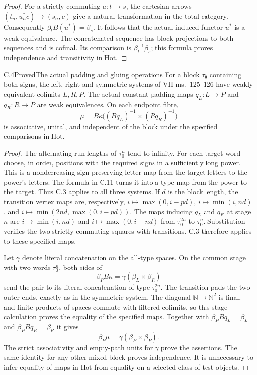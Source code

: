 \begin{proof}
For a strictly commuting $u:t\to s$, the cartesian arrows
$(t_n,u_n^*c)\to(s_n,c)$ give a natural transformation in the total
category. Consequently $\beta_t B(u^*)=\beta_s$. It follows that
the actual induced functor $u^*$ is a weak equivalence. The
concatenated sequence has block projections to both sequences and
is cofinal. Its comparison is $\beta_t^{-1}\beta_s$; this formula
proves independence and transitivity in $\mathrm{Hot}$.
\end{proof}

\begin{claim}{C.4}{Proved}{The actual padding and gluing operations}
For a block $\tau_0$ containing both signs, the left, right and
symmetric systems of VII ms.~125--126 have weakly equivalent
colimits $L,R,P$. The actual constant-padding maps $q_L:L\to P$
and $q_R:R\to P$ are weak equivalences. On each endpoint fibre,
\[
 \mu=B\kappa\bigl((Bq_L)^{-1}\times(Bq_R)^{-1}\bigr)
\]
is associative, unital, and independent of the block under the
specified comparisons in $\mathrm{Hot}$.
\end{claim}
\begin{proof}
The alternating-run lengths of $\tau_0^n$ tend to infinity.
For each target word choose, in order, positions with the required
signs in a sufficiently long power. This is a nondecreasing
sign-preserving letter map from the target letters to the power's
letters. The formula in C.11 turns it into a type map from the
power to the target. Thus C.3 applies to all three systems.
If $d$ is the block length, the transition vertex maps are,
respectively, $i\mapsto\max(0,i-pd)$, $i\mapsto\min(i,nd)$,
and $i\mapsto\min(2nd,\max(0,i-pd))$. The maps inducing $q_L$
and $q_R$ at stage $n$ are $i\mapsto\min(i,nd)$ and
$i\mapsto\max(0,i-nd)$ from $\tau_0^{2n}$ to $\tau_0^n$.
Substitution verifies the two strictly commuting squares with
transitions. C.3 therefore applies to these specified maps.

Let $\gamma$ denote literal concatenation on the all-type spaces.
On the common stage with two words $\tau_0^n$, both sides of
\[
 \beta_P B\kappa=\gamma(\beta_L\times\beta_R)
\]
send the pair to its literal concatenation of type $\tau_0^{2n}$.
The transition pads the two outer ends, exactly as in the symmetric
system. The diagonal $\mathbb N\to\mathbb N^2$ is final, and
finite products of spaces commute with filtered colimits, so this
stage calculation proves the equality of the specified maps.
Together with $\beta_P Bq_L=\beta_L$ and
$\beta_P Bq_R=\beta_R$ it gives
\[
 \beta_P\mu=\gamma(\beta_P\times\beta_P).
\]
The strict associativity and empty-path units for $\gamma$ prove
the assertions. The same identity for any other mixed block proves
independence. It is unnecessary to infer equality of maps in
$\mathrm{Hot}$ from equality on a selected class of test objects.
\end{proof}

